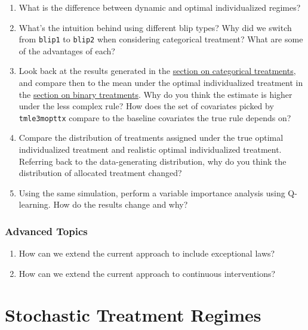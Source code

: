 \documentclass[12pt, krantz2,]{krantz}
\newcommand{\passthrough}[1]{#1}
\theoremstyle{definition}
\theoremstyle{definition}
\theoremstyle{definition}
\newcommand{\1}{\mathbbm{1}}
\begin{document}
\begin{enumerate}
\def\labelenumi{\arabic{enumi}.}
\item
  What is the difference between dynamic and optimal individualized regimes?
\item
  What's the intuition behind using different blip types? Why did we switch
  from \passthrough{\lstinline!blip1!} to \passthrough{\lstinline!blip2!} when considering categorical treatment? What are some
  of the advantages of each?
\item
  Look back at the results generated in the \protect\hyperlink{oit-eval-cat}{section on categorical
  treatments}, and compare then to the mean under the optimal
  individualized treatment in the \protect\hyperlink{oit-eval-bin}{section on binary
  treatments}. Why do you think the estimate is higher under the
  less complex rule? How does the set of covariates picked by \passthrough{\lstinline!tmle3mopttx!}
  compare to the baseline covariates the true rule depends on?
\item
  Compare the distribution of treatments assigned under the true optimal
  individualized treatment and realistic optimal individualized treatment.
  Referring back to the data-generating distribution, why do you think the
  distribution of allocated treatment changed?
\item
  Using the same simulation, perform a variable importance analysis using
  Q-learning. How do the results change and why?
\end{enumerate}

\hypertarget{advanced-topics-1}{%
\subsection{Advanced Topics}\label{advanced-topics-1}}

\begin{enumerate}
\def\labelenumi{\arabic{enumi}.}
\item
  How can we extend the current approach to include exceptional laws?
\item
  How can we extend the current approach to continuous interventions?
\end{enumerate}

\hypertarget{stochastic-treatment-regimes}{%
\chapter{Stochastic Treatment Regimes}\label{stochastic-treatment-regimes}}
\end{document}
